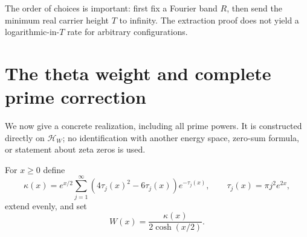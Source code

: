 \documentclass[11pt]{article}
\theoremstyle{definition}
\theoremstyle{remark}
\newcommand{\HH}{\mathcal H_W}
\begin{document}
The order of choices is important: first fix a Fourier band $R$, then
send the minimum real carrier height $T$ to infinity. The extraction proof
does not yield a logarithmic-in-$T$ rate for arbitrary configurations.

\section{The theta weight and complete prime correction}\label{sec:theta}

We now give a concrete realization, including all prime powers. It is
constructed directly on $\HH$; no identification with another energy
space, zero-sum formula, or statement about zeta zeros is used.

For $x\ge0$ define
\begin{equation}\label{eq:theta-kernel}
 \kappa(x)=e^{x/2}\sum_{j=1}^\infty
 (4\tau_j(x)^2-6\tau_j(x))e^{-\tau_j(x)},\qquad
 \tau_j(x)=\pi j^2e^{2x},
\end{equation}
extend evenly, and set
\begin{equation}\label{eq:theta-weight}
 W(x)=\frac{\kappa(x)}{2\cosh(x/2)}.
\end{equation}
\end{document}
